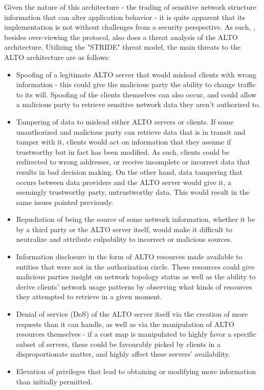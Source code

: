     Given the nature of this architecture - the trading of sensitive network structure information that can alter application behavior - it is quite apparent that its implementation is not without challenges from a security perspective.
    As such, \cite{alto-protocol}, besides over-viewing the protocol, also does a threat analysis of the ALTO architecture.
    Utilizing the "STRIDE" threat model, the main threats to the ALTO architecture are as follows:

\begin{itemize}
    \item Spoofing of a legitimate ALTO server that would mislead clients with wrong information - this could give the malicious party the ability to change traffic to its will.
        Spoofing of the clients themselves can also occur, and could allow a malicious party to retrieve sensitive network data they aren't authorized to.
    \item Tampering of data to mislead either ALTO servers or clients.
        If some unauthorized and malicious party can retrieve data that is in transit and tamper with it, clients would act on information that they assume if trustworthy but in fact has been modified.
        As such, clients could be redirected to wrong addresses, or receive incomplete or incorrect data that results in bad decision making.
        On the other hand, data tampering that occurs between data providers and the ALTO server would give it, a seemingly trustworthy party, untrustworthy data.
        This would result in the same issues pointed previously.
    \item Repudiation of being the source of some network information, whether it be by a third party or the ALTO server itself, would make it difficult to neutralize and attribute culpability to incorrect or malicious sources.
    \item Information disclosure in the form of ALTO resources made available to entities that were not in the authorization circle.
            These resources could give malicious parties insight on network topology status as well as the ability to derive clients' network usage patterns by observing what kinds of resources they attempted to retrieve in a given moment.
    \item Denial of service (DoS) of the ALTO server itself via the creation of more requests than it can handle, as well as via the manipulation of ALTO resources themselves - if a cost map is manipulated to highly favor a specific subset of servers, these could be favourably picked by clients in a disproportionate matter, and highly affect these servers' availability.
    \item Elevation of privileges that lead to obtaining or modifying more information than initially permitted.
\end{itemize}

